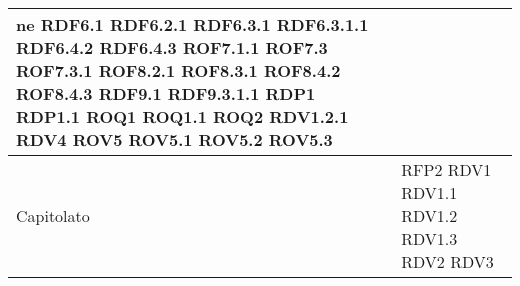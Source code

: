 \begin{center}
\begin{longtable}{| p{4cm} | p{4cm} |}
ne RDF6.1 \newline RDF6.2.1 \newline RDF6.3.1 \newline RDF6.3.1.1 \newline RDF6.4.2 \newline RDF6.4.3 \newline ROF7.1.1 \newline ROF7.3 \newline ROF7.3.1 \newline ROF8.2.1 \newline ROF8.3.1 \newline ROF8.4.2 \newline ROF8.4.3 \newline RDF9.1 \newline RDF9.3.1.1 \newline RDP1 \newline RDP1.1 \newline ROQ1 \newline ROQ1.1 \newline ROQ2 \newline RDV1.2.1 \newline RDV4 \newline ROV5 \newline ROV5.1 \newline ROV5.2 \newline ROV5.3 \\
	\hline
	Capitolato  &  RFP2 \newline RDV1 \newline RDV1.1 \newline RDV1.2 \newline RDV1.3 \newline RDV2 \newline RDV3 \\
	\hline


\end{longtable}
\end{center}
